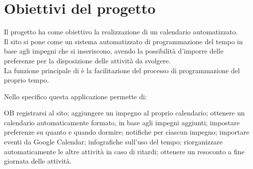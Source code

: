 \section{Obiettivi del progetto}
\label{sec:ObiettiviProgetto}
Il progetto ha come obiettivo la realizzazione di un calendario automatizzato.\\
Il sito si pone come un sistema automatizzato di programmazione del tempo in base agli impegni che si inseriscono, avendo la possibilità d'imporre delle preferenze per la disposizione delle attività da svolgere.\\
La funzione principale di \nome è la facilitazione del processo di programmazione del proprio tempo.

\vspace{0.5cm}

Nello specifico questa applicazione permette di:
\begin {mylist} {OB} 
       registrarsi al sito;
       aggiungere un impegno al proprio calendario;
       ottenere un calendario automaticamente formato, in base agli impegni aggiunti; 
       impostare preferenze su quanto e quando dormire;
       notifiche per ciascun impegno; 
       importare eventi da Google Calendar; 
       infografiche sull'uso del tempo;
       riorganizzare automaticamente le altre attività in caso di ritardi;
       ottenere un resoconto a fine giornata delle attività.
\end{mylist}
